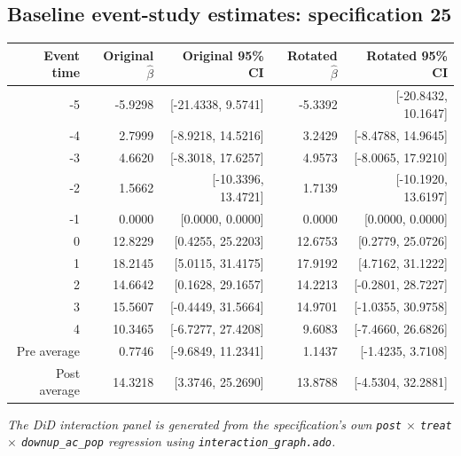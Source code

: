 \documentclass[10pt]{article}
\begin{document}
\subsection*{Baseline event-study estimates: specification 25}
\begin{center}
\scriptsize
\begin{tabular}{r rr rr}
\toprule
Event time & Original $\hat\beta$ & Original 95\% CI & Rotated $\hat\beta$ & Rotated 95\% CI \\
\midrule
-5 & -5.9298 & [-21.4338, 9.5741] & -5.3392 & [-20.8432, 10.1647] \\
-4 & 2.7999 & [-8.9218, 14.5216] & 3.2429 & [-8.4788, 14.9645] \\
-3 & 4.6620 & [-8.3018, 17.6257] & 4.9573 & [-8.0065, 17.9210] \\
-2 & 1.5662 & [-10.3396, 13.4721] & 1.7139 & [-10.1920, 13.6197] \\
-1 & 0.0000 & [0.0000, 0.0000] & 0.0000 & [0.0000, 0.0000] \\
0 & 12.8229 & [0.4255, 25.2203] & 12.6753 & [0.2779, 25.0726] \\
1 & 18.2145 & [5.0115, 31.4175] & 17.9192 & [4.7162, 31.1222] \\
2 & 14.6642 & [0.1628, 29.1657] & 14.2213 & [-0.2801, 28.7227] \\
3 & 15.5607 & [-0.4449, 31.5664] & 14.9701 & [-1.0355, 30.9758] \\
4 & 10.3465 & [-6.7277, 27.4208] & 9.6083 & [-7.4660, 26.6826] \\
\midrule
Pre average & 0.7746 & [-9.6849, 11.2341] & 1.1437 & [-1.4235, 3.7108] \\
Post average & 14.3218 & [3.3746, 25.2690] & 13.8788 & [-4.5304, 32.2881] \\
\bottomrule
\end{tabular}
\end{center}
\medskip
\textit{The DiD interaction panel is generated from the specification's own \texttt{post} $\times$ \texttt{treat} $\times$ \texttt{downup\_ac\_pop} regression using \texttt{interaction\_graph.ado}.}
\clearpage
\end{document}
